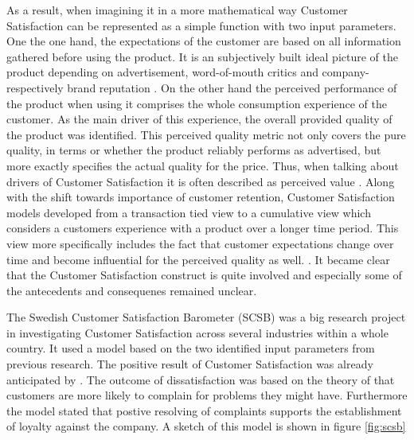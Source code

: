 As a result, when imagining it in a more mathematical way Customer Satisfaction can be represented as a simple function with two input parameters. One the one hand, the expectations of the customer are based on all information gathered before using the product. It is an subjectively built ideal picture of the product depending on advertisement, word-of-mouth critics and company- respectively brand reputation \cite{johnson2001evolution} \cite{neckel2015}. On the other hand the perceived performance of the product when using it comprises the whole consumption experience of the customer. As the main driver of this experience, the overall provided quality of the product was identified. This perceived quality metric not only covers the pure quality, in terms or whether the product reliably performs as advertised, but more exactly specifies the actual quality for the price. Thus, when talking about drivers of Customer Satisfaction it is often described as perceived value \cite{johnson2001evolution} \cite{fornell1992national}. Along with the shift towards importance of customer retention, Customer Satisfaction models developed from a transaction tied view to a cumulative view which considers a customers experience with a product over a longer time period. This view more specifically includes the fact that customer expectations change over time and become influential for the perceived quality as well. \cite{johnson1996expectations}. It became clear that the Customer Satisfaction construct is quite involved and especially some of the antecedents and consequenes remained unclear. 

The Swedish Customer Satisfaction Barometer (SCSB) was a big research project in investigating Customer Satisfaction across several industries within a whole country. It used a model based on the two identified input parameters from previous research. The positive result of Customer Satisfaction was already anticipated by \cite{bolton1998dynamic} \cite{gustafsson2005effects}. The outcome of dissatisfaction was based on the theory of \cite{hulett1971exit} that customers are more likely to complain for problems they might have. Furthermore the model stated that postive resolving of complaints supports the establishment of loyalty against the company. A sketch of this model is shown in figure \ref{fig:scsb}

